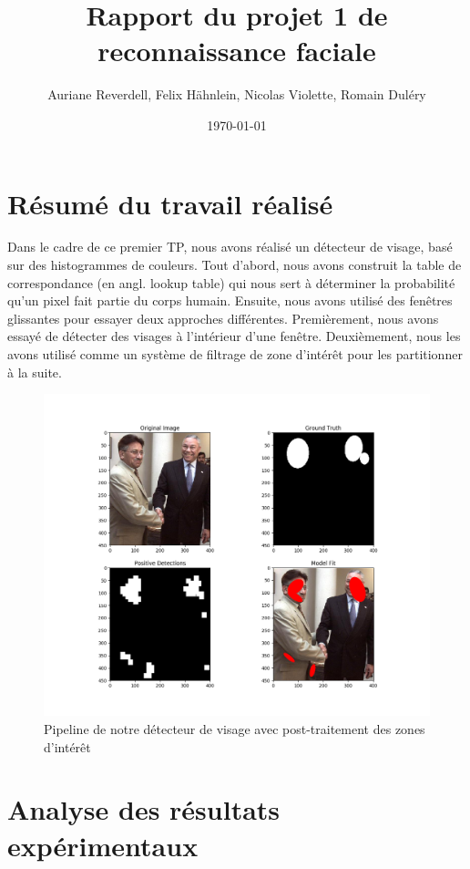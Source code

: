 \documentclass[a4paper,11pt]{article}
\title{Rapport du projet 1 de reconnaissance faciale}
\author{Auriane Reverdell, Felix Hähnlein, Nicolas Violette, Romain Duléry}
\date{\today}
\begin{document}
\maketitle
\vspace{1cm}

\section{Résumé du travail réalisé}
Dans le cadre de ce premier TP, nous avons réalisé un détecteur de visage, basé sur des histogrammes de couleurs. 
Tout d'abord, nous avons construit la table de correspondance (en angl. lookup table) qui nous sert à déterminer la probabilité qu'un pixel fait partie du corps humain.
Ensuite, nous avons utilisé des fenêtres glissantes pour essayer deux approches différentes.
Premièrement, nous avons essayé de détecter des visages à l'intérieur d'une fenêtre. 
Deuxièmement, nous les avons utilisé comme un système de filtrage de zone d'intérêt pour les partitionner à la suite.
\begin{figure}[H]
\begin{center}
    \includegraphics[scale=0.45]{resume_clustering.png}
    \caption{Pipeline de notre détecteur de visage avec post-traitement des zones d'intérêt}
\end{center}
\end{figure}

\section{Analyse des résultats expérimentaux}
\end{document}
